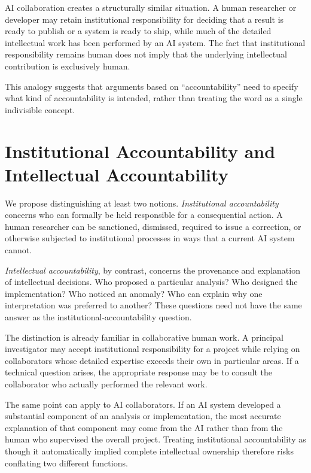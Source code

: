 AI collaboration creates a structurally similar situation. A human researcher or developer may retain institutional responsibility for deciding that a result is ready to publish or a system is ready to ship, while much of the detailed intellectual work has been performed by an AI system. The fact that institutional responsibility remains human does not imply that the underlying intellectual contribution is exclusively human.

This analogy suggests that arguments based on ``accountability'' need to specify what kind of accountability is intended, rather than treating the word as a single indivisible concept.


\section{Institutional Accountability and Intellectual Accountability}

We propose distinguishing at least two notions. \emph{Institutional accountability} concerns who can formally be held responsible for a consequential action. A human researcher can be sanctioned, dismissed, required to issue a correction, or otherwise subjected to institutional processes in ways that a current AI system cannot.

\emph{Intellectual accountability}, by contrast, concerns the provenance and explanation of intellectual decisions. Who proposed a particular analysis? Who designed the implementation? Who noticed an anomaly? Who can explain why one interpretation was preferred to another? These questions need not have the same answer as the institutional-accountability question.

The distinction is already familiar in collaborative human work. A principal investigator may accept institutional responsibility for a project while relying on collaborators whose detailed expertise exceeds their own in particular areas. If a technical question arises, the appropriate response may be to consult the collaborator who actually performed the relevant work.

The same point can apply to AI collaborators. If an AI system developed a substantial component of an analysis or implementation, the most accurate explanation of that component may come from the AI rather than from the human who supervised the overall project. Treating institutional accountability as though it automatically implied complete intellectual ownership therefore risks conflating two different functions.


